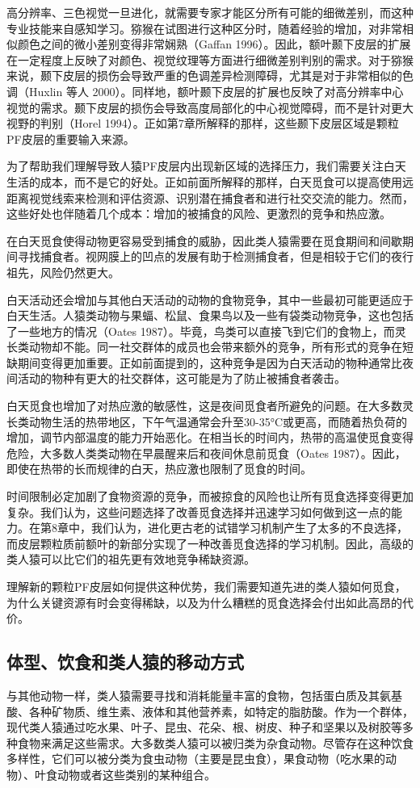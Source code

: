 高分辨率、三色视觉一旦进化，就需要专家才能区分所有可能的细微差别，而这种专业技能来自感知学习。猕猴在试图进行这种区分时，随着经验的增加，对非常相似颜色之间的微小差别变得非常娴熟（Gaffan 1996）。因此，额叶颞下皮层的扩展在一定程度上反映了对颜色、视觉纹理等方面进行细微差别判别的需求。对于猕猴来说，颞下皮层的损伤会导致严重的色调差异检测障碍，尤其是对于非常相似的色调（Huxlin 等人 2000）。同样地，额叶颞下皮层的扩展也反映了对高分辨率中心视觉的需求。颞下皮层的损伤会导致高度局部化的中心视觉障碍，而不是针对更大视野的判别（Horel 1994）。正如第7章所解释的那样，这些颞下皮层区域是颗粒PF皮层的重要输入来源。

为了帮助我们理解导致人猿PF皮层内出现新区域的选择压力，我们需要关注白天生活的成本，而不是它的好处。正如前面所解释的那样，白天觅食可以提高使用远距离视觉线索来检测和评估资源、识别潜在捕食者和进行社交交流的能力。然而，这些好处也伴随着几个成本：增加的被捕食的风险、更激烈的竞争和热应激。

在白天觅食使得动物更容易受到捕食的威胁，因此类人猿需要在觅食期间和间歇期间寻找捕食者。视网膜上的凹点的发展有助于检测捕食者，但是相较于它们的夜行祖先，风险仍然更大。

白天活动还会增加与其他白天活动的动物的食物竞争，其中一些最初可能更适应于白天生活。人猿类动物与果蝠、松鼠、食果鸟以及一些有袋类动物竞争，这也包括了一些地方的情况（Oates 1987）。毕竟，鸟类可以直接飞到它们的食物上，而灵长类动物却不能。同一社交群体的成员也会带来额外的竞争，所有形式的竞争在短缺期间变得更加重要。正如前面提到的，这种竞争是因为白天活动的物种通常比夜间活动的物种有更大的社交群体，这可能是为了防止被捕食者袭击。

白天觅食也增加了对热应激的敏感性，这是夜间觅食者所避免的问题。在大多数灵长类动物生活的热带地区，下午气温通常会升至30-35°C或更高，而随着热负荷的增加，调节内部温度的能力开始恶化。在相当长的时间内，热带的高温使觅食变得危险，大多数人类类动物在早晨醒来后和夜间休息前觅食（Oates 1987）。因此，即使在热带的长而规律的白天，热应激也限制了觅食的时间。

时间限制必定加剧了食物资源的竞争，而被掠食的风险也让所有觅食选择变得更加复杂。我们认为，这些问题选择了改善觅食选择并迅速学习如何做到这一点的能力。在第8章中，我们认为，进化更古老的试错学习机制产生了太多的不良选择，而皮层颗粒质前额叶的新部分实现了一种改善觅食选择的学习机制。因此，高级的类人猿可以比它们的祖先更有效地竞争稀缺资源。

理解新的颗粒PF皮层如何提供这种优势，我们需要知道先进的类人猿如何觅食，为什么关键资源有时会变得稀缺，以及为什么糟糕的觅食选择会付出如此高昂的代价。

\subsection{体型、饮食和类人猿的移动方式}
与其他动物一样，类人猿需要寻找和消耗能量丰富的食物，包括蛋白质及其氨基酸、各种矿物质、维生素、液体和其他营养素，如特定的脂肪酸。作为一个群体，现代类人猿通过吃水果、叶子、昆虫、花朵、根、树皮、种子和坚果以及树胶等多种食物来满足这些需求。大多数类人猿可以被归类为杂食动物。尽管存在这种饮食多样性，它们可以被分类为食虫动物（主要是昆虫食），果食动物（吃水果的动物）、叶食动物或者这些类别的某种组合。

